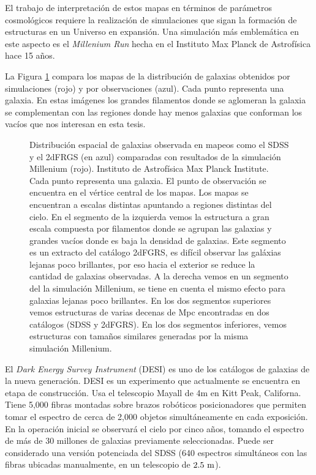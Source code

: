 \documentclass[preprint]{aastex62}
\begin{document}
El trabajo de interpretaci\'on de estos mapas en t\'erminos de
par\'ametros cosmol\'ogicos requiere la realizaci\'on de simulaciones
que sigan la formaci\'on de estructuras en un Universo en expansi\'on.
Una simulación m\'as emblem\'atica en este aspecto es el \textit{Millenium Run}
hecha en el Instituto Max Planck de Astrof\'isica hace 15 a\~nos. 

La Figura \ref{fig:pie_millenium_walls} compara los mapas de la
distribuci\'on de galaxias obtenidos por simulaciones (rojo) y por
observaciones (azul).
Cada punto representa una galaxia.
En estas im\'agenes los grandes filamentos donde se aglomeran la
galaxia se complementan con las regiones donde hay menos galaxias que
conforman los vac\'ios que nos interesan en esta tesis.

  \begin{figure}
    \caption{Distribuci\'on espacial de galaxias observada en mapeos como el SDSS y
      el 2dFRGS (en azul) comparadas con resultados de la simulación Millenium (rojo).
      Instituto de Astrofísica Max Planck Institute. Cada punto representa una galaxia.
      El punto de observación se encuentra en el vértice central de los mapas. Los mapas
      se encuentran a escalas distintas apuntando a regiones distintas del cielo.
      En el segmento de la izquierda vemos la estructura a gran escala compuesta por
      filamentos donde se agrupan las galaxias y grandes vacíos donde es baja la densidad
      de galaxias. Este segmento es un extracto del catálogo 2dFGRS, es difícil observar
      las galáxias lejanas poco brillantes, por eso hacia el exterior se reduce la cantidad
      de galaxias observadas. A la derecha vemos en un segmento del la simulación Millenium,
      se tiene en cuenta el mismo efecto para galaxias lejanas poco brillantes. En los dos
      segmentos superiores vemos estructuras de varias decenas de Mpc encontradas en dos
      catálogos (SDSS y 2dFGRS). En los dos segmentos inferiores, vemos estructuras con
      tamaños similares generadas por la misma simulación Millenium.
      \label{fig:pie_millenium_walls}}
  \end{figure}
  
  El \textit{Dark Energy Survey Instrument} (DESI) es uno de los catálogos de galaxias
  de la nueva generación. DESI es un experimento que actualmente se encuentra en etapa
  de construcción. Usa el telescopio Mayall de 4m en Kitt Peak, Californa. Tiene
  5,000 fibras montadas sobre brazos robóticos posicionadores que permiten tomar  el espectro
  de cerca de 2,000 objetos
  simultáneamente en cada exposición. En la operación inicial se observará el cielo por
  cinco años, tomando el espectro de más de 30 millones de galaxias previamente seleccionadas.
  Puede ser considerado una versión potenciada del SDSS (640 espectros simultáneos con las
  fibras ubicadas manualmente, en un telescopio de $2.5 \rm~m$).
\end{document}
